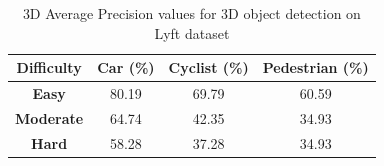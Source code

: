 \documentclass[10pt,twocolumn,letterpaper]{article}
\begin{document}

\begin{table}[!htbp]
    \centering
    \begin{tabular}{|c|c|c|c|}
        \hline \textbf{Difficulty} & \textbf{Car (\%)} & \textbf{Cyclist (\%)} & \textbf{Pedestrian (\%)}  \\
        \hline \textbf{Easy} & 80.19  & 69.79  & 60.59 \\
        \hline \textbf{Moderate} & 64.74  & 42.35 & 34.93 \\
        \hline \textbf{Hard} & 58.28  & 37.28  & 34.93  \\
        \hline
    \end{tabular}
	\caption[3D AP calculated for 2D proposals generated from 3D Annotations]{3D Average Precision values for 3D object detection on Lyft dataset }
	\label{3DAP Values-1}
    \end{table}
\end{document}
